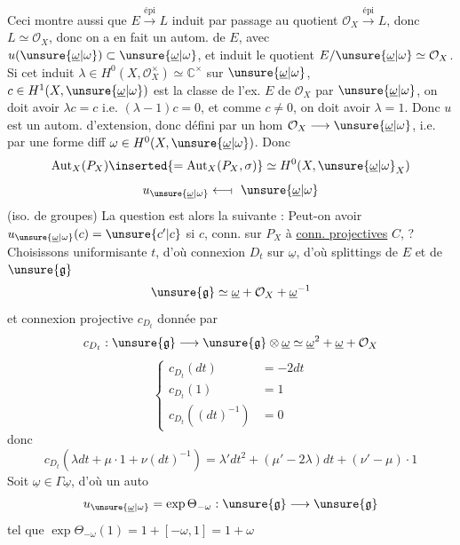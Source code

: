 Ceci montre aussi  que $E\xrightarrow{\mathrm{épi}}L$ induit par passage au quotient $\mathcal O_X\xrightarrow{\mathrm{épi}}L$, donc $L\simeq\mathcal O_X$, donc on a en fait un autom. de $E$, avec $u(\unsure{\underline{\omega}|\omega})\subset\unsure{\underline{\omega}|\omega}$, et induit   le quotient $E/\unsure{\underline{\omega}|\omega}\simeq\mathcal O_X$. Si cet  induit $\lambda\in H^0(X,\mathcal O_X^\times)\simeq\mathbb C^\times$ sur $\unsure{\underline{\omega}|\omega}$,  $c\in H^1(X,\unsure{\underline{\omega}|\omega})$ est la classe de l'ex. $E$ de $\mathcal O_X$ par $\unsure{\underline{\omega}|\omega}$, on doit avoir $\lambda c=c$ i.e. $(\lambda-1)c=0$, et comme $c\ne0$, on doit avoir $\lambda=1$. Donc $u$ est un autom. d'extension, donc défini par un hom $\mathcal O_X\longrightarrow\unsure{\underline{\omega}|\omega}$, i.e. par une forme diff $\omega\in H^0(X,\unsure{\underline{\omega}|\omega})$. Donc
\[
\operatorname{Aut}_X(P_X)\inserted{=\operatorname{Aut}_X(P_X,\sigma)}\simeq H^0(X,\unsure{\underline{\omega}|\omega}_X)
\]
\[
u_{\unsure{\underline{\omega}|\omega}}\longleftarrow\!\shortmid\ \unsure{\underline{\omega}|\omega}
\]
(iso. de groupes) La question est alors la suivante : Peut-on avoir $u_{\unsure{\underline{\omega}|\omega}}(c)=\unsure{c'|c}$ si $c$,  conn. sur $P_X$  à  \uline{conn. projectives} $C$,  ?
Choisissons uniformisante $t$, d'où connexion $D_t$ sur $\underline{\omega}$, d'où splittings de $E$ et de $\unsure{\mathfrak g}$
\[
\unsure{\mathfrak g}\simeq\underline{\omega}+\mathcal O_X+\underline{\omega}^{-1}
\]
et connexion projective $c_{D_t}$ donnée par
\[
c_{D_t}:\unsure{\mathfrak g}\longrightarrow\unsure{\mathfrak g}\otimes\underline{\omega}\simeq\underline{\omega}^2+\underline{\omega}+\mathcal O_X
\]
\[
\left\{\begin{aligned}
c_{D_t}(dt)&=-2dt\\
c_{D_t}(1)&=1\\
c_{D_t}((dt)^{-1})&=0
\end{aligned}\right.
\]
donc
\[
c_{D_t}(\lambda dt+\mu\cdot1+\nu(dt)^{-1})=\lambda'dt^2+(\mu'-2\lambda)dt+(\nu'-\mu)\cdot1
\]
Soit $\underline{\omega}\in\Gamma\underline{\omega}$, d'où un auto
\[
u_{\unsure{\underline{\omega}|\omega}}=\exp\Theta_{-\omega}:\unsure{\mathfrak g}\longrightarrow\unsure{\mathfrak g}
\]
tel que $\exp\Theta_{-\omega}(1)=1+[-\omega,1]=1+\omega$

